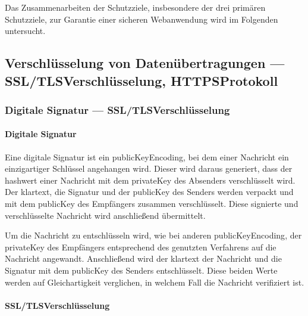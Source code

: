 Das Zusammenarbeiten der Schutzziele, insbesondere der drei primären Schutzziele, zur Garantie einer sicheren Webanwendung wird im Folgenden untersucht.

\subsection[Verschlüsselung von Datenübertragungen]{Verschlüsselung von Datenübertragungen — \ac{SSL}/\ac{TLS}\nonbreakdash Verschlüsselung, \ac{HTTPS}\nonbreakdash Protokoll}\label{subsec:verschluesselung_von_datenuebertragungen}

\subsubsection[Digitale Signatur - SSL/TLS-Verschlüsselung]{Digitale Signatur — \ac{SSL}/\ac{TLS}\nonbreakdash Verschlüsselung}\label{subsubsec:digitale-signaturen-und-zertifikate}

\paragraph{Digitale Signatur}\label{par:digitale-signatur}

Eine digitale Signatur ist ein \gls{publicKeyEncoding}, bei dem einer Nachricht ein einzigartiger Schlüssel angehangen wird.
Dieser wird daraus generiert, dass der \gls{hashwert} einer Nachricht mit dem \gls{privateKey} des Absenders verschlüsselt wird\autocite[\pagef~297]{6391693}.
Der \gls{klartext}, die Signatur und der \gls{publicKey} des Senders werden verpackt und mit dem \gls{publicKey} des Empfängers zusammen verschlüsselt.
Diese signierte und verschlüsselte Nachricht wird anschließend übermittelt\autocite[\pagef~297]{6391693}.

Um die Nachricht zu entschlüsseln wird, wie bei anderen \gls{publicKeyEncoding}, der \gls{privateKey} des Empfängers entsprechend des genutzten Verfahrens auf die Nachricht angewandt.
Anschließend wird der \gls{klartext} der Nachricht  und die Signatur mit dem \gls{publicKey} des Senders entschlüsselt.
Diese beiden Werte werden auf Gleichartigkeit verglichen, in welchem Fall die Nachricht verifiziert ist\autocite[\pagef~297]{6391693}.

\paragraph[SSL/TLS-Verschlüsselung]{\ac{SSL}/\ac{TLS}\nonbreakdash Verschlüsselung}

